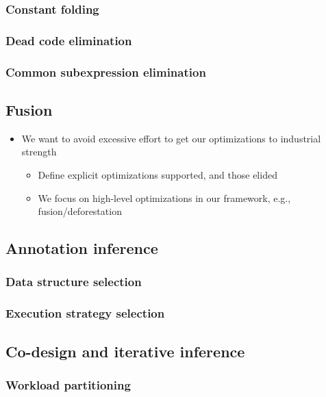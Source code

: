 \documentclass[10pt]{article}
\begin{document}
    \subsubsection{Constant folding}
    \subsubsection{Dead code elimination}
    \subsubsection{Common subexpression elimination}

  \subsection{Fusion}
    \begin{itemize}
      \item We want to avoid excessive effort to get our optimizations to industrial strength
        \begin{itemize}
        \item Define explicit optimizations supported, and those elided
        \item We focus on high-level optimizations in our framework, e.g., fusion/deforestation
        \end{itemize}
    \end{itemize}

  \subsection{Annotation inference}
    \subsubsection{Data structure selection}
    \subsubsection{Execution strategy selection}

  \subsection{Co-design and iterative inference}
    \subsubsection{Workload partitioning}
\end{document}

